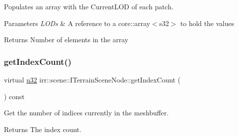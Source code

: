 Populates an array with the Current\+L\+OD of each patch. 


\begin{DoxyParams}{Parameters}
{\em L\+O\+Ds} & A reference to a core\+::array$<$s32$>$ to hold the values \\
\hline
\end{DoxyParams}
\begin{DoxyReturn}{Returns}
Number of elements in the array 
\end{DoxyReturn}
\mbox{\label{classirr_1_1scene_1_1ITerrainSceneNode_a0f09a8260f325570ce58f0fc6993aff9}} 
\subsubsection{\texorpdfstring{get\+Index\+Count()}{getIndexCount()}}
{\footnotesize\ttfamily virtual \hyperlink{namespaceirr_a0416a53257075833e7002efd0a18e804}{u32} irr\+::scene\+::\+I\+Terrain\+Scene\+Node\+::get\+Index\+Count (\begin{DoxyParamCaption}{ }\end{DoxyParamCaption}) const\hspace{0.3cm}{\ttfamily [pure virtual]}}



Get the number of indices currently in the meshbuffer. 

\begin{DoxyReturn}{Returns}
The index count. 
\end{DoxyReturn}
\mbox{\label{classirr_1_1scene_1_1ITerrainSceneNode_aec6d83c4882fad10a0b35ca5a7ec0935}} 
